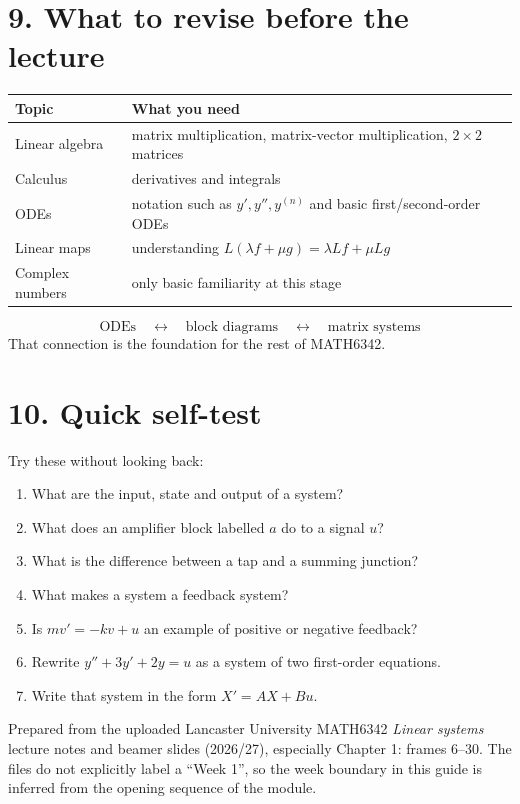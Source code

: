 \documentclass[11pt,a4paper]{article}
\begin{document}
\section{9. What to revise before the lecture}

\begin{center}
\begin{tabular}{p{5cm}p{7cm}}
\toprule
\textbf{Topic} & \textbf{What you need}\\
\midrule
Linear algebra & matrix multiplication, matrix-vector multiplication, $2\times 2$ matrices \\
Calculus & derivatives and integrals \\
ODEs & notation such as $y',y'',y^{(n)}$ and basic first/second-order ODEs \\
Linear maps & understanding $L(\lambda f+\mu g)=\lambda Lf+\mu Lg$ \\
Complex numbers & only basic familiarity at this stage \\
\bottomrule
\end{tabular}
\end{center}

\begin{rememberbox}
\[
\boxed{\text{ODEs} \quad\longleftrightarrow\quad \text{block diagrams} \quad\longleftrightarrow\quad \text{matrix systems}}
\]
That connection is the foundation for the rest of MATH6342.
\end{rememberbox}

\section{10. Quick self-test}

Try these without looking back:
\begin{enumerate}[leftmargin=1.2cm]
\item What are the input, state and output of a system?
\item What does an amplifier block labelled $a$ do to a signal $u$?
\item What is the difference between a tap and a summing junction?
\item What makes a system a feedback system?
\item Is $m v'=-kv+u$ an example of positive or negative feedback?
\item Rewrite $y''+3y'+2y=u$ as a system of two first-order equations.
\item Write that system in the form $X'=AX+Bu$.
\end{enumerate}

\begin{note}[Source]
Prepared from the uploaded Lancaster University MATH6342 \emph{Linear systems} lecture notes and beamer slides (2026/27), especially Chapter 1: frames 6--30. The files do not explicitly label a ``Week 1'', so the week boundary in this guide is inferred from the opening sequence of the module.
\end{note}
\end{document}
